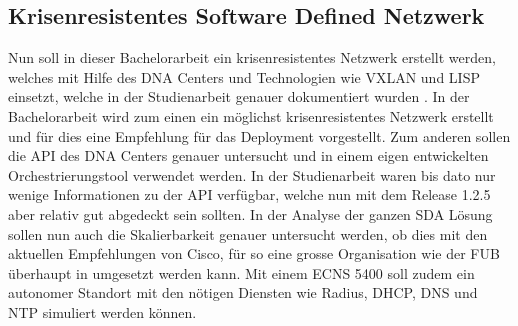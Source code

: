 \subsection{Krisenresistentes Software Defined Netzwerk}
Nun soll in dieser Bachelorarbeit ein krisenresistentes Netzwerk erstellt werden, welches mit Hilfe des DNA Centers und Technologien wie VXLAN und LISP einsetzt, welche in der Studienarbeit genauer dokumentiert wurden \cite{studienarbeit}. In der Bachelorarbeit wird zum einen ein möglichst krisenresistentes Netzwerk erstellt und für dies eine Empfehlung für das Deployment vorgestellt. Zum anderen sollen die API des DNA Centers genauer untersucht und in einem eigen entwickelten Orchestrierungstool verwendet werden. In der Studienarbeit waren bis dato nur wenige Informationen zu der API verfügbar, welche nun mit dem Release 1.2.5 aber relativ gut abgedeckt sein sollten. In der Analyse der ganzen SDA Lösung sollen nun auch die Skalierbarkeit genauer untersucht werden, ob dies mit den aktuellen Empfehlungen von Cisco, für so eine grosse Organisation wie der FUB überhaupt in umgesetzt werden kann. Mit einem ECNS 5400 soll zudem ein autonomer Standort mit den nötigen Diensten wie Radius, DHCP, DNS und NTP simuliert werden können.






